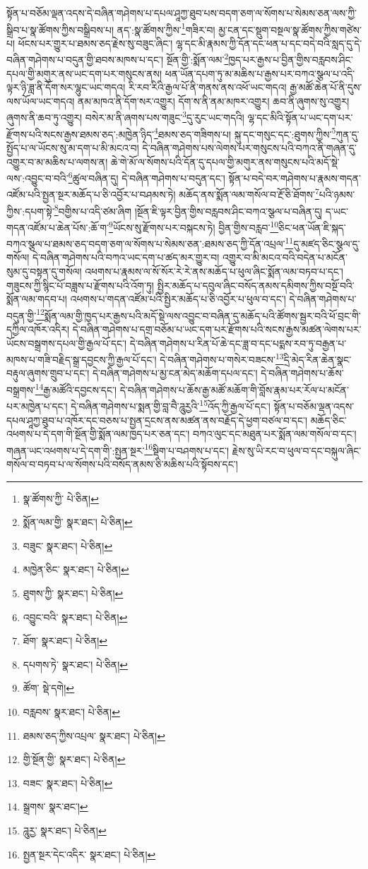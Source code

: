 སྟོན་པ་བཅོམ་ལྡན་འདས་དེ་བཞིན་གཤེགས་པ་དཔལ་ཤཱཀྱ་ཐུབ་པས་བདག་ཅག་ལ་སོགས་པ་སེམས་ཅན་ལས་ཀྱི་སྒྲིབ་པ་སྣ་ཚོགས་ཀྱིས་བསྒྲིབས་པ། ནད་:སྣ་ཚོགས་ཀྱིས་\footnote{སྣ་ཚོགས་ཀྱི་  པེ་ཅིན། }གཟིར་བ། མྱ་ངན་དང་སྡུག་བསྔལ་སྣ་ཚོགས་ཀྱིས་གཙེས་པ། ཕོངས་པར་གྱུར་པ་ཐམས་ཅད་རྗེས་སུ་བཟུང་ཞིང་། ལྷ་དང་མི་རྣམས་ཀྱི་དོན་དང་ཕན་པ་དང་བདེ་བའི་སླད་དུ་དེ་བཞིན་གཤེགས་པ་བདུན་གྱི་ཐབས་མཁས་པ་དང་། སྔོན་གྱི་:སྨོན་ལམ་\footnote{སྨོན་ལམ་གྱི་  སྣར་ཐང་།  པེ་ཅིན། }ཁྱད་པར་རྒྱས་པ་བྱིན་གྱིས་བརླབས་ཤིང་དཔལ་གྱི་མགུར་ནས་ཡང་དག་པར་གསུངས་ནས། ཕན་ཡོན་དཔག་ཏུ་མ་མཆིས་པ་རྒྱས་པར་བཀའ་སྩལ་པ་འདི་ལྟར་ཉི་ཟླ་ནི་དོག་སར་ལྷུང་ཡང་གདའ། རི་རབ་རིའི་རྒྱལ་པོ་ནི་གནས་ནས་འཕོ་ཡང་གདའ། རྒྱ་མཚོ་ཆེན་པོ་ནི་དུས་ལས་ཡོལ་ཡང་གདའ། ནམ་མཁའ་ནི་དོག་སར་འགྱུར། དོག་ས་ནི་ནམ་མཁར་འགྱུར། ཆབ་ནི་ཞུགས་སུ་འགྱུར། ཞུགས་ནི་ཆབ་ཏུ་འགྱུར། བསེར་མ་ནི་ཞགས་པས་གཟུང་\footnote{བཟུང་  སྣར་ཐང་།  པེ་ཅིན། }དུ་རུང་ཡང་གདའི། ལྷ་དང་མིའི་སྟོན་པ་ཡང་དག་པར་རྫོགས་པའི་སངས་རྒྱས་ཐམས་ཅད་:མཁྱེན་ཉིད་\footnote{མཁྱེན་ཅིང་  སྣར་ཐང་།  པེ་ཅིན། }ཐམས་ཅད་གཟིགས་པ། སྐུ་དང་གསུང་དང་:ཐུགས་ཀྱིས་\footnote{ཐུགས་ཀྱི་  སྣར་ཐང་།  པེ་ཅིན། }ཀུན་དུ་སྤྱོད་པ་ལ་ཡོངས་སུ་མ་དག་པ་མི་མངའ་བ། དེ་བཞིན་གཤེགས་པས་ལེགས་པར་གསུངས་པའི་བཀའ་ནི་གཞན་དུ་འགྱུར་བ་མ་མཆིས་པ་ལགས་ན། ཆེ་གེ་མོ་ལ་སོགས་པའི་དོན་དུ་དཔལ་གྱི་མགུར་ནས་གསུངས་པའི་མདོ་སྡེ་ལས་:འབྱུང་བ་བའི་\footnote{འབྱུང་བའི་  སྣར་ཐང་།  པེ་ཅིན། }ཚུལ་བཞིན་དུ། དེ་བཞིན་གཤེགས་པ་བདུན་དང་། སྟོན་པ་བདེ་བར་གཤེགས་པ་རྣམས་གདན་འཛོམ་པའི་སྤྱན་སྔར་མཆོད་པ་ཅི་འབྱོར་པ་བཤམས་ཏེ། མཆོད་ནས་སྨོན་ལམ་གསོལ་བ་རྔོ་ཅི་ཐོགས་\footnote{ཐོག་  སྣར་ཐང་།  པེ་ཅིན། }པའི་ཉམས་ཀྱིས་:དཔག་སྟེ་\footnote{དཔགས་ཏེ་  སྣར་ཐང་།  པེ་ཅིན། }བགྱིས་པ་འདི་ཙམ་ཞིག །སྔོན་ཇི་ལྟར་བྱིན་གྱིས་བརླབས་ཤིང་བཀའ་སྩལ་པ་བཞིན་དུ། ད་ཡང་གདན་འཛོམ་པ་ཆེན་པོས་:ཆོ་ག་\footnote{ཚོག་  སྡེ་དགེ། }ཡོངས་སུ་རྫོགས་པར་བསྐངས་ཏེ། བྱིན་གྱིས་བརླབ་\footnote{བརླབས་  སྣར་ཐང་།  པེ་ཅིན། }ཅིང་ཕན་ཡོན་ཇི་སྐད་བཀའ་སྩལ་པ་ཐམས་ཅད་བདག་ཅག་ལ་སོགས་པ་སེམས་ཅན་:ཐམས་ཅད་ཀྱི་དོན་འཔྲལ་\footnote{ཐམས་ཅད་ཀྱིས་འཔྲལ་  སྣར་ཐང་།  པེ་ཅིན། }དུ་མཛད་ཅིང་སྩལ་དུ་གསོལ། དེ་བཞིན་གཤེགས་པའི་བཀའ་ཡང་དག་པ་ཚད་མར་གྱུར་བ། འགྱུར་བ་མི་མངའ་བའི་བདེན་པ་མངོན་སུམ་དུ་བསྟན་དུ་གསོལ། འཕགས་པ་རྣམས་ལ་སོ་སོར་རེ་རེ་ནས་མཆོད་པ་ཕུལ་ཞིང་སྨོན་ལམ་བཏབ་པ་དང་། གཟུངས་ཀྱི་སྙིང་པོ་བཟླས་པ་རྫོགས་པའི་འོག་ཏུ། སྤྱིར་མཆོད་པ་དབུལ་ཞིང་བསོད་ནམས་དམིགས་ཀྱིས་བསྔོ་བའི་སྨོན་ལམ་གདབ་པ། འཕགས་པ་གདན་འཛོམ་པའི་སྤྱིར་མཆོད་པ་ཅི་འབྱོར་པ་ཕུལ་བ་དང་། དེ་བཞིན་གཤེགས་པ་བདུན་གྱི་\footnote{གྱི་སྔོན་གྱི་  སྣར་ཐང་།  པེ་ཅིན། }སྨོན་ལམ་གྱི་ཁྱད་པར་རྒྱས་པའི་མདོ་སྡེ་ལས་འབྱུང་བ་བཞིན་དུ་མཆོད་པའི་ཚོགས་སྦྱར་བའི་ཕོ་བྲང་གི་དཀྱིལ་འཁོར་འདིར། དེ་བཞིན་གཤེགས་པ་དགྲ་བཅོམ་པ་ཡང་དག་པར་རྫོགས་པའི་སངས་རྒྱས་མཚན་ལེགས་པར་ཡོངས་བསྒྲགས་དཔལ་གྱི་རྒྱལ་པོ་དང་། དེ་བཞིན་གཤེགས་པ་རིན་པོ་ཆེ་དང་ཟླ་བ་དང་པདྨས་རབ་ཏུ་བརྒྱན་པ་མཁས་པ་གཟི་བརྗིད་སྒྲ་དབྱངས་ཀྱི་རྒྱལ་པོ་དང་། དེ་བཞིན་གཤེགས་པ་གསེར་བཟངས་\footnote{བཟང་  སྣར་ཐང་།  པེ་ཅིན། }དྲི་མེད་རིན་ཆེན་སྣང་བརྟུལ་ཞུགས་གྲུབ་པ་དང་། དེ་བཞིན་གཤེགས་པ་མྱ་ངན་མེད་མཆོག་དཔལ་དང་། དེ་བཞིན་གཤེགས་པ་ཆོས་བསྒྲགས་\footnote{སྒྲགས་  སྣར་ཐང་། }རྒྱ་མཚོའི་དབྱངས་དང་། དེ་བཞིན་གཤེགས་པ་ཆོས་རྒྱ་མཚོ་མཆོག་གི་བློས་རྣམ་པར་རོལ་པ་མངོན་པར་མཁྱེན་པ་དང་། དེ་བཞིན་གཤེགས་པ་སྨན་གྱི་བླ་བཻ་ཌཱུརྱའི་\footnote{ཌཱུརྱ་  སྣར་ཐང་།  པེ་ཅིན། }འོད་ཀྱི་རྒྱལ་པོ་དང་། སྟོན་པ་བཅོམ་ལྡན་འདས་དཔལ་ཤཱཀྱ་ཐུབ་པ་འཁོར་དང་བཅས་པ་སྤྱན་དྲངས་ནས་མཚན་ནས་བརྗོད་དེ་ཕྱག་བཙལ་བ་དང་། མཆོད་ཅིང་འཕགས་པ་དེ་དག་གི་སྔོན་གྱི་སྨོན་ལམ་ཁྱད་པར་ཅན་དང་། བཀའ་ལུང་དང་མཐུན་པར་སྨོན་ལམ་གསོལ་བ་དང་། གཞན་ཡང་འཕགས་པ་དེ་དག་གི་:སྤྱན་སྔར་\footnote{སྤྱན་སྔར་དེང་འདིར་  སྣར་ཐང་།  པེ་ཅིན། }སྡིག་པ་བཤགས་པ་དང་། རྗེས་སུ་ཡི་རང་བ་ཕུལ་བ་དང་བསྐུལ་ཞིང་གསོལ་བ་བཏབ་པ་ལ་སོགས་པའི་བསོད་ནམས་ཅི་མཆིས་པའི་སྟོབས་དང་། 